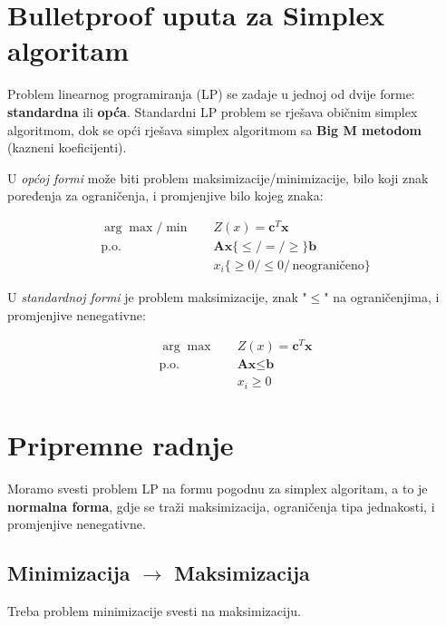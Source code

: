 \documentclass[12pt,a4paper]{article}
\date{}
\begin{document}
\section*{Bulletproof uputa za Simplex algoritam}

Problem linearnog programiranja (LP) se zadaje u jednoj od dvije forme: \textbf{standardna} ili \textbf{opća}. Standardni LP problem se rješava običnim simplex algoritmom, dok se opći rješava simplex algoritmom sa \textbf{Big M metodom} (kazneni koeficijenti).

U \textit{općoj formi} može biti problem maksimizacije/minimizacije, bilo koji znak poređenja za ograničenja, i promjenjive bilo kojeg znaka:

\begin{equation}
\begin{aligned}
\arg\max/\min \quad & Z(x) = \textbf{c}^T \textbf{x} \\
\text{p.o.} \quad & \textbf{Ax} \{\leq / = / \geq\} \textbf{b} \\
& x_i \{\geq 0 / \leq 0 / \,\text{neograničeno}\}
\end{aligned}
\end{equation}

U \textit{standardnoj formi} je problem maksimizacije, znak "$\leq$" na ograničenjima, i promjenjive nenegativne:

\begin{equation}
\begin{aligned}
\arg\max \quad & Z(x) = \textbf{c}^T \textbf{x} \\
\text{p.o.} \quad & \textbf{Ax} \leq \textbf{b} \\
& x_i \geq 0
\end{aligned}
\end{equation}

\section{Pripremne radnje}

Moramo svesti problem LP na formu pogodnu za simplex algoritam, a to je \textbf{normalna forma}, gdje se traži maksimizacija, ograničenja tipa jednakosti, i promjenjive nenegativne.

\subsection{Minimizacija $\rightarrow$ Maksimizacija}

Treba problem minimizacije svesti na maksimizaciju.
\end{document}
